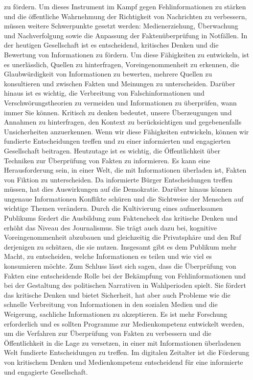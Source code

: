 \documentclass[a4paper,listof=totoc,bibliography=totoc]{scrartcl}
\begin{document}
zu fördern. Um dieses Instrument im Kampf gegen Fehlinformationen zu stärken und die öffentliche Wahrnehmung der Richtigkeit von Nachrichten zu verbessern, müssen 
weitere Schwerpunkte gesetzt werden: Medienerziehung, Überwachung und Nachverfolgung sowie die Anpassung der Faktenüberprüfung in Notfällen. 
In der heutigen Gesellschaft ist es entscheidend, kritisches Denken und die Bewertung von Informationen zu fördern. Um diese Fähigkeiten zu entwickeln, ist es unerlässlich, 
Quellen zu hinterfragen, Voreingenommenheit zu erkennen, die Glaubwürdigkeit von Informationen zu bewerten, mehrere Quellen zu konsultieren und zwischen Fakten und 
Meinungen zu unterscheiden. Darüber hinaus ist es wichtig, die Verbreitung von Falschinformationen und Verschwörungstheorien zu vermeiden und Informationen zu überprüfen, 
wann immer Sie können. Kritisch zu denken bedeutet, unsere Überzeugungen und Annahmen zu hinterfragen, den Kontext zu berücksichtigen und gegebenenfalls Unsicherheiten 
anzuerkennen. Wenn wir diese Fähigkeiten entwickeln, können wir fundierte Entscheidungen treffen und zu einer informierten und engagierten Gesellschaft beitragen. 
Heutzutage ist es wichtig, die Öffentlichkeit über Techniken zur Überprüfung von Fakten zu informieren. Es kann eine Herausforderung sein, in einer Welt, die mit Informationen 
überladen ist, Fakten von Fiktion zu unterscheiden. Da informierte Bürger Entscheidungen treffen müssen, hat dies Auswirkungen auf die Demokratie. Darüber hinaus können 
ungenaue Informationen Konflikte schüren und die Sichtweise der Menschen auf wichtige Themen verändern. Durch die Kultivierung eines aufmerksamen Publikums fördert die Ausbildung 
zum Faktencheck das kritische Denken und erhöht das Niveau des Journalismus. Sie trägt auch dazu bei, kognitive Voreingenommenheit abzubauen und gleichzeitig die Privatsphäre 
und den Ruf derjenigen zu schützen, die sie nutzen. Insgesamt gibt es dem Publikum mehr Macht, zu entscheiden, welche Informationen es teilen und wie viel es konsumieren möchte. 
Zum Schluss lässt sich sagen, dass die Überprüfung von Fakten eine entscheidende Rolle bei der Bekämpfung von Fehlinformationen und bei der Gestaltung des politischen 
Narrativen in Wahlperioden spielt. Sie fördert das kritische Denken und bietet Sicherheit, hat aber auch Probleme wie die schnelle Verbreitung von Informationen in den 
sozialen Medien und die Weigerung, sachliche Informationen zu akzeptieren. Es ist mehr Forschung erforderlich und es sollten Programme zur Medienkompetenz entwickelt werden, 
um die Verfahren zur Überprüfung von Fakten zu verbessern und die Öffentlichkeit in die Lage zu versetzen, in einer mit Informationen überladenen Welt fundierte Entscheidungen 
zu treffen. Im digitalen Zeitalter ist die Förderung von kritischem Denken und Medienkompetenz entscheidend für eine informierte und engagierte Gesellschaft.

\newpage
{}

\end{document}
